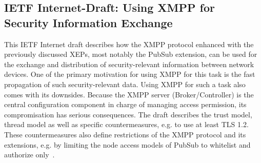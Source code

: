 \subsection{IETF Internet-Draft: Using XMPP for Security Information Exchange}
This IETF Internet draft describes how the XMPP protocol enhanced with the previously discussed XEPs, most notably the PubSub extension, can be used for the exchange and distribution of security-relevant information between network devices. One of the primary motivation for using XMPP for this task is the fast propagation of such security-relevant data. Using XMPP for such a task also comes with its downsides. Because the XMPP server (Broker/Controller) is the central configuration component in charge of managing access permission, its compromisation has serious consequences. The draft describes the trust model, thread model as well as specific countermeasures, e.g. to use at least TLS 1.2. These countermeasures also define restrictions of the XMPP protocol and its extensions, e.g. by limiting the node access models of PubSub to whitelist and authorize only~\cite{ietf-mile-xmpp-grid-05}.


